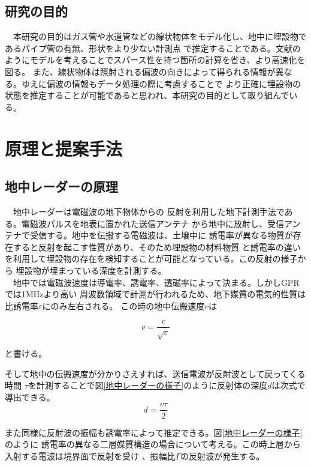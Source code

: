 \documentclass[a4paper,12pt]{jsreport}
\begin{document}
\section{研究の目的}
　本研究の目的はガス管や水道管などの線状物体をモデル化し、地中に埋設物であるパイプ管の有無、形状をより少ない計測点
で推定することである。文献\cite{imai}のようにモデルを考えることでスパース性を持つ箇所の計算を省き、より高速化を図る。
また、線状物体は照射される偏波の向きによって得られる情報が異なる。ゆえに偏波の情報もデータ処理の際に考慮することで
より正確に埋設物の状態を推定することが可能であると思われ、本研究の目的として取り組んでいる。





\chapter{原理と提案手法}



\section{地中レーダーの原理}
　地中レーダーは電磁波の地下物体からの
反射を利用した地下計測手法である。電磁波パルスを地表に置かれた送信アンテナ
から地中に放射し、受信アンテナで受信する。地中を伝搬する電磁波は、土壌中に
誘電率が異なる物質が存在すると反射を起こす性質があり、そのため埋設物の材料物質
と誘電率の違いを利用して埋設物の存在を検知することが可能となっている。この反射の様子から
埋設物が埋まっている深度を計測する。
\\　地中では電磁波速度は導電率、誘電率、透磁率によって決まる。しかしGPRでは1MHzより高い
周波数領域で計測が行われるため、地下媒質の電気的性質は比誘電率$\varepsilon$にのみ左右される。
この時の地中伝搬速度$v$は

\begin{equation}
  v =
  \frac{c}{\sqrt{\varepsilon}} 
  \end{equation}

と書ける。


そして地中の伝搬速度が分かりさえすれば、送信電波が反射波として戻ってくる時間
$\tau$を計測することで図\ref{地中レーダーの様子}のように反射体の深度$d$は次式で導出できる。
\begin{equation}
  d=
  \frac{v \tau}{2} 
  \end{equation}
  
また同様に反射波の振幅も誘電率によって推定できる。図\ref{地中レーダーの様子}のように
誘電率の異なる二層媒質構造の場合について考える。この時上層から入射する電波は境界面で反射を受け
、振幅比$\Gamma$の反射波が発生する。
\end{document}
